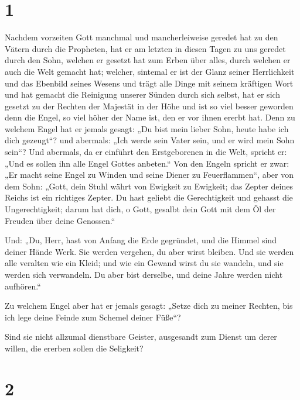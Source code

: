 \hypertarget{section}{%
\section{1}\label{section}}

 Nachdem vorzeiten Gott manchmal und mancherleiweise
geredet hat zu den Vätern durch die Propheten,  hat er am
letzten in diesen Tagen zu uns geredet durch den Sohn, welchen er
gesetzt hat zum Erben über alles, durch welchen er auch die Welt gemacht
hat;  welcher, sintemal er ist der Glanz seiner
Herrlichkeit und das Ebenbild seines Wesens und trägt alle Dinge mit
seinem kräftigen Wort und hat gemacht die Reinigung unserer Sünden durch
sich selbst, hat er sich gesetzt zu der Rechten der Majestät in der Höhe
 und ist so viel besser geworden denn die Engel, so viel
höher der Name ist, den er vor ihnen ererbt hat.  Denn zu
welchem Engel hat er jemals gesagt: „Du bist mein lieber Sohn, heute
habe ich dich gezeugt``? und abermals: „Ich werde sein Vater sein, und
er wird mein Sohn sein``?  Und abermals, da er einführt
den Erstgeborenen in die Welt, spricht er: „Und es sollen ihn alle Engel
Gottes anbeten.``  Von den Engeln spricht er zwar: „Er
macht seine Engel zu Winden und seine Diener zu Feuerflammen``,
 aber von dem Sohn: „Gott, dein Stuhl währt von Ewigkeit
zu Ewigkeit; das Zepter deines Reichs ist ein richtiges Zepter.
 Du hast geliebt die Gerechtigkeit und gehasst die
Ungerechtigkeit; darum hat dich, o Gott, gesalbt dein Gott mit dem Öl
der Freuden über deine Genossen.``

 Und: „Du, Herr, hast von Anfang die Erde gegründet, und
die Himmel sind deiner Hände Werk.  Sie werden vergehen,
du aber wirst bleiben. Und sie werden alle veralten wie ein Kleid;
 und wie ein Gewand wirst du sie wandeln, und sie werden
sich verwandeln. Du aber bist derselbe, und deine Jahre werden nicht
aufhören.``

 Zu welchem Engel aber hat er jemals gesagt: „Setze dich
zu meiner Rechten, bis ich lege deine Feinde zum Schemel deiner Füße``?

 Sind sie nicht allzumal dienstbare Geister, ausgesandt
zum Dienst um derer willen, die ererben sollen die Seligkeit?

\hypertarget{section-1}{%
\section{2}\label{section-1}}

